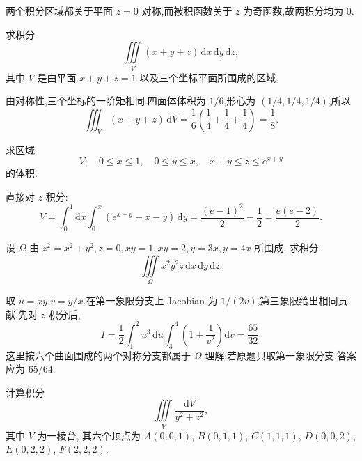 \begin{solution}
    两个积分区域都关于平面 $z=0$ 对称,而被积函数关于 $z$ 为奇函数,故两积分均为 $0$.
\end{solution}

\begin{example}
    求积分
    \[
        \displaystyle\iiint\limits_V(x+y+z)\,\mathrm{d}x\,\mathrm{d}y\,\mathrm{d}z,
    \]
    其中 $V$ 是由平面 $x+y+z=1$ 以及三个坐标平面所围成的区域.
\end{example}
\exampleblank

\begin{solution}
    由对称性,三个坐标的一阶矩相同.四面体体积为 $1/6$,形心为 $(1/4,1/4,1/4)$,所以
    \[
        \displaystyle\iiint_V(x+y+z)\,\mathrm{d}V
        =\dfrac{1}{6}\left(\dfrac{1}{4}+\dfrac{1}{4}+\dfrac{1}{4}\right)=\dfrac{1}{8}.
    \]
\end{solution}

\begin{example}
    求区域
    \[
        V:\quad0\leq x\leq1,\quad0\leq y\leq x,\quad x+y\leq z\leq e^{x+y}
    \]
    的体积.
\end{example}
\exampleblank

\begin{solution}
    直接对 $z$ 积分:
    \[
        V=\int_0^1\!\mathrm{d}x\int_0^x\left(e^{x+y}-x-y\right)\,\mathrm{d}y
        =\dfrac{(e-1)^2}{2}-\dfrac{1}{2}
        =\dfrac{e(e-2)}{2}.
    \]
\end{solution}

\begin{example}
    设 $\Omega$ 由 $z^2=x^2+y^2,z=0,xy=1,xy=2,y=3x,y=4x$ 所围成, 求积分
    \[
        \displaystyle\iiint\limits_\Omega x^2y^2z\,\mathrm{d}x\,\mathrm{d}y\,\mathrm{d}z.
    \]
\end{example}
\exampleblank

\begin{solution}
    取 $u=xy$,$v=y/x$.在第一象限分支上 Jacobian 为 $1/(2v)$,第三象限给出相同贡献.先对 $z$ 积分后,
    \[
        I=\dfrac{1}{2}\int_1^2u^3\,\mathrm{d}u\int_3^4\left(1+\dfrac{1}{v^2}\right)\mathrm{d}v
        =\dfrac{65}{32}.
    \]
    这里按六个曲面围成的两个对称分支都属于 $\Omega$ 理解;若原题只取第一象限分支,答案应为 $65/64$.
\end{solution}

\begin{example}
    计算积分
    \[
        \displaystyle\iiint\limits_V\dfrac{\mathrm{d}V}{y^2+z^2},
    \]
    其中 $V$ 为一棱台, 其六个顶点为 $A(0,0,1)$, $B(0,1,1)$, $C(1,1,1)$, $D(0,0,2)$, $E(0,2,2)$, $F(2,2,2)$.
\end{example}
\exampleblank

